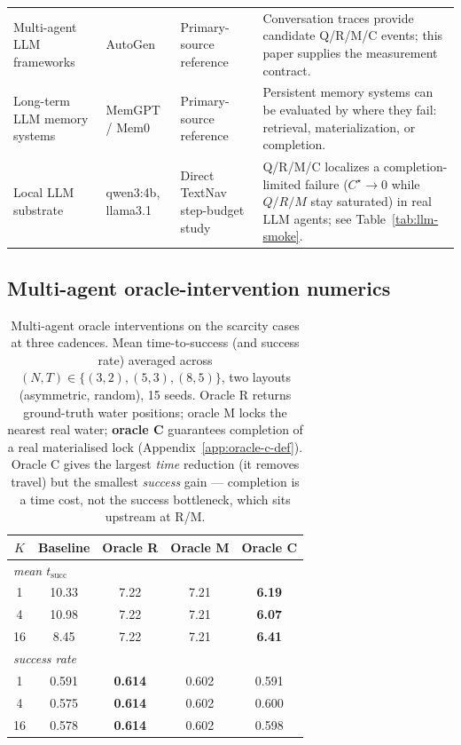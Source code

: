 \documentclass{article}
\begin{document}
\begin{table}[h]
\begin{tabular}{p{2.45cm}p{2.55cm}p{2.7cm}p{4.0cm}}
Multi-agent LLM frameworks & AutoGen \citep{wu2023autogen} & Primary-source reference & Conversation traces provide candidate Q/R/M/C events; this paper supplies the measurement contract. \\
Long-term LLM memory systems & MemGPT / Mem0 \citep{packer2023memgpt,chhikara2025mem0} & Primary-source reference & Persistent memory systems can be evaluated by where they fail: retrieval, materialization, or completion. \\
Local LLM substrate & qwen3:4b, llama3.1 & Direct TextNav step-budget study & Q/R/M/C localizes a completion-limited failure ($C^\star{\to}0$ while $Q/R/M$ stay saturated) in real LLM agents; see Table~\ref{tab:llm-smoke}. \\
\bottomrule
\end{tabular}
\end{table}

\subsection{Multi-agent oracle-intervention numerics}
\label{app:multi-oracle}

\begin{table}[h]
\caption{Multi-agent oracle interventions on the scarcity cases at three cadences. Mean time-to-success (and success rate) averaged across $(N,T)\in\{(3,2),(5,3),(8,5)\}$, two layouts (asymmetric, random), 15 seeds. Oracle R returns ground-truth water positions; oracle M locks the nearest real water; \textbf{oracle C} guarantees completion of a real materialised lock (Appendix~\ref{app:oracle-c-def}). Oracle C gives the largest \emph{time} reduction (it removes travel) but the smallest \emph{success} gain --- completion is a time cost, not the success bottleneck, which sits upstream at R/M.}
\label{tab:multi-agent-oracle}
\centering
\small
\begin{tabular}{c c c c c}
\toprule
$K$ & Baseline & Oracle R & Oracle M & Oracle C \\
\midrule
\multicolumn{5}{l}{\emph{mean $t_{\mathrm{succ}}$}}\\
1  & 10.33 & 7.22 & 7.21 & \textbf{6.19} \\
4  & 10.98 & 7.22 & 7.21 & \textbf{6.07} \\
16 &  8.45 & 7.22 & 7.21 & \textbf{6.41} \\
\midrule
\multicolumn{5}{l}{\emph{success rate}}\\
1  & 0.591 & \textbf{0.614} & 0.602 & 0.591 \\
4  & 0.575 & \textbf{0.614} & 0.602 & 0.600 \\
16 & 0.578 & \textbf{0.614} & 0.602 & 0.598 \\
\bottomrule
\end{tabular}
\end{table}
\end{document}
